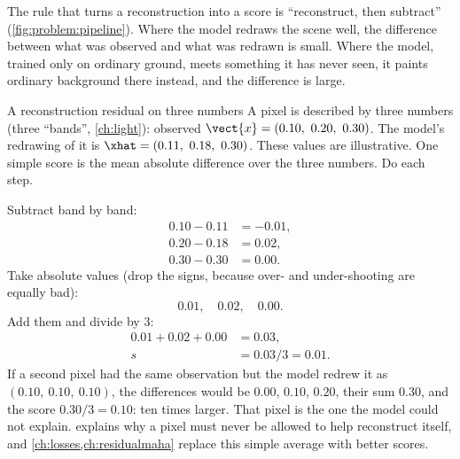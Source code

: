 The rule that turns a reconstruction into a score is ``reconstruct, then subtract''
(\cref{fig:problem:pipeline}). Where the model redraws the scene well, the difference between
what was observed and what was redrawn is small. Where the model, trained only on ordinary
ground, meets something it has never seen, it paints ordinary background there instead, and the
difference is large.


\begin{worked}[label={we:problem:residual}]{A reconstruction residual on three numbers}
A pixel is described by three numbers (three ``bands'', \cref{ch:light}): observed
$\vect{x} = (0.10,\ 0.20,\ 0.30)$. The model's redrawing of it is
$\xhat = (0.11,\ 0.18,\ 0.30)$. These values are illustrative\tagA. One simple score is the mean
absolute difference over the three numbers. Do each step.

Subtract band by band:
\begin{align*}
0.10 - 0.11 &= -0.01,\\
0.20 - 0.18 &= 0.02,\\
0.30 - 0.30 &= 0.00.
\end{align*}
Take absolute values (drop the signs, because over- and under-shooting are equally bad):
\[ 0.01,\quad 0.02,\quad 0.00. \]
Add them and divide by $3$:
\begin{align*}
0.01 + 0.02 + 0.00 &= 0.03,\\
s &= 0.03/3 = 0.01.
\end{align*}
If a second pixel had the same observation but the model redrew it as $(0.10,\ 0.10,\ 0.10)$,
the differences would be $0.00$, $0.10$, $0.20$, their sum $0.30$, and the score
$0.30/3 = 0.10$: ten times larger. That pixel is the one the model could not explain.
 explains why a pixel must never be allowed to help reconstruct itself, and
\cref{ch:losses,ch:residualmaha} replace this simple average with better scores.
\end{worked}

